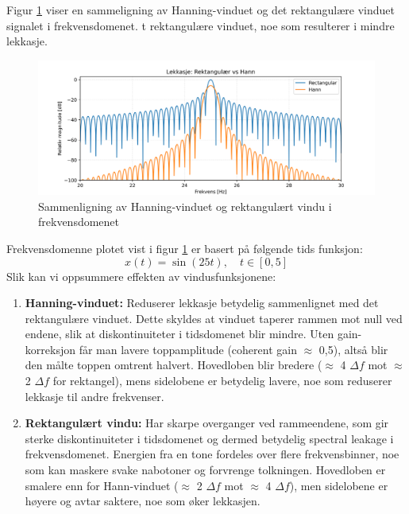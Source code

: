 Figur \ref{fig:frekvens_spekter} viser en sammeligning av Hanning-vinduet og det rektangulære vinduet signalet i frekvensdomenet. t rektangulære vinduet, noe som resulterer i mindre lekkasje.
\clearpage
\begin{figure}[h!]
    \centering
    \includegraphics[width=1\textwidth]{./Media/frekvens_spekter.png}
    \caption{Sammenligning av Hanning-vinduet og rektangulært vindu i frekvensdomenet}
    \label{fig:frekvens_spekter}
\end{figure}
Frekvensdomenne plotet vist i figur \ref{fig:frekvens_spekter} er basert på følgende tids funksjon:
\[
    x(t) = \sin(25t), \quad t \in [0, 5]
\]
Slik kan vi oppsummere effekten av vindusfunksjonene:
\begin{enumerate}[label=\null]
    \item \textbf{Hanning-vinduet:} Reduserer lekkasje betydelig sammenlignet med det rektangulære vinduet. Dette skyldes at vinduet taperer rammen mot null ved endene, slik at diskontinuiteter i tidsdomenet blir mindre. Uten gain-korreksjon får man lavere toppamplitude (coherent gain $\approx$ 0,5), altså blir den målte toppen omtrent halvert. Hovedloben blir bredere ($\approx$ 4 $\Delta f$ mot $\approx$ 2 $\Delta f$ for rektangel), mens sidelobene er betydelig lavere, noe som reduserer lekkasje til andre frekvenser.\\
    \item \textbf{Rektangulært vindu:} Har skarpe overganger ved rammeendene, som gir sterke diskontinuiteter i tidsdomenet og dermed betydelig spectral leakage i frekvensdomenet. Energien fra en tone fordeles over flere frekvensbinner, noe som kan maskere svake nabotoner og forvrenge tolkningen. Hovedloben er smalere enn for Hann-vinduet ($\approx$ 2 $\Delta f$ mot $\approx$ 4 $\Delta f$), men sidelobene er høyere og avtar saktere, noe som øker lekkasjen.
\end{enumerate}
